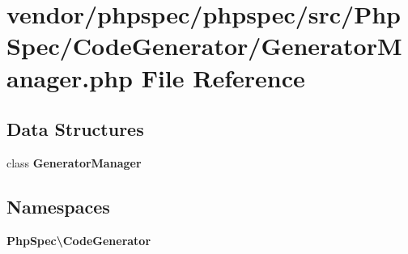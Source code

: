 \section{vendor/phpspec/phpspec/src/\+Php\+Spec/\+Code\+Generator/\+Generator\+Manager.php File Reference}
\label{_generator_manager_8php}
\subsection*{Data Structures}
\begin{DoxyCompactItemize}
\item 
class {\bf Generator\+Manager}
\end{DoxyCompactItemize}
\subsection*{Namespaces}
\begin{DoxyCompactItemize}
\item 
 {\bf Php\+Spec\textbackslash{}\+Code\+Generator}
\end{DoxyCompactItemize}
